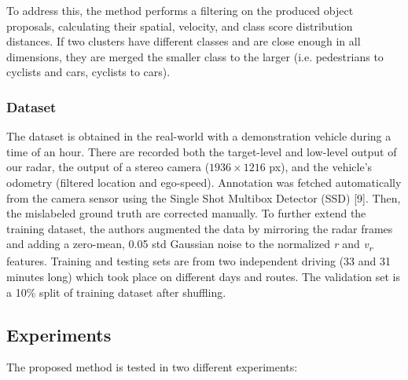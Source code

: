 To address this, the method performs a filtering on the produced object
proposals, calculating their spatial, velocity, and class score
distribution distances. If two clusters have different classes and are
close enough in all dimensions, they are merged the smaller class to the
larger (i.e. pedestrians to cyclists and cars, cyclists to cars).

\subsubsection{Dataset}\label{header-n390}

The dataset is obtained in the real-world with a demonstration vehicle
during a time of an hour. There are recorded both the target-level and
low-level output of our radar, the output of a stereo camera ($1936 \times
1216$ px), and the vehicle's odometry (filtered location and ego-speed).
Annotation was fetched automatically from the camera sensor using the
Single Shot Multibox Detector (SSD) {[}9{]}. Then, the mislabeled ground
truth are corrected manually. To further extend the training dataset,
the authors augmented the data by mirroring the radar frames and adding
a zero-mean, 0.05 std Gaussian noise to the normalized \emph{r} and
\emph{v\textsubscript{r}} features. Training and testing sets are from
two independent driving (33 and 31 minutes long) which took place on
different days and routes. The validation set is a 10\% split of
training dataset after shuffling.

\subsection{Experiments}\label{header-n392}

The proposed method is tested in two different experiments:

